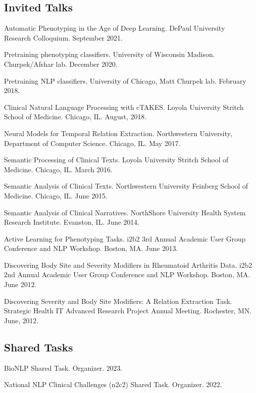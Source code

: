 \documentclass[letterpaper]{article}
\renewenvironment{itemize}{
  \begin{list}{}{
    \setlength{\leftmargin}{1.5em}
  }
}{
  \end{list}
}
\begin{document}
\subsection*{Invited Talks}
\begin{itemize}
\item Automatic Phenotyping in the Age of Deep Learning. DePaul University Research Colloquium. September 2021.
\item Pretraining phenotyping classifiers. University of Wisconsin Madison. Churpek/Afshar lab. December 2020.
\item Pretraining NLP classifiers. University of Chicago, Matt Churpek lab. February 2018.
\item Clinical Natural Language Processing with cTAKES. Loyola University Stritch School of Medicine. Chicago, IL. August, 2018.
\item Neural Models for Temporal Relation Extraction. Northwestern University, Department of Computer Science. Chicago, IL. May 2017.
\item Semantic Processing of Clinical Texts. Loyola University Stritch School of Medicine. Chicago, IL. March 2016.
\item Semantic Analysis of Clinical Texts. Northwestern University Feinberg School of Medicine. Chicago, IL. June 2015.
\item Semantic Analysis of Clinical Narratives. NorthShore University Health System Research Institute. Evanston, IL. June 2014.
\item Active Learning for Phenotyping Tasks. i2b2 3rd Annual Academic User Group Conference and NLP Workshop. Boston, MA. June 2013.
\item Discovering Body Site and Severity Modifiers in Rheumatoid Arthritis Data. i2b2 2nd Annual Academic User Group Conference and NLP Workshop. Boston, MA. June 2012.
\item Discovering Severity and Body Site Modifiers: A Relation Extraction Task. Strategic Health IT Advanced Research Project Annual Meeting. Rochester, MN. June, 2012.
\end{itemize}

\subsection*{Shared Tasks}
\begin{itemize}
\item BioNLP Shared Task. Organizer. 2023.
\item National NLP Clinical Challenges (n2c2) Shared Task. Organizer. 2022.
\end{itemize}
\end{document}
